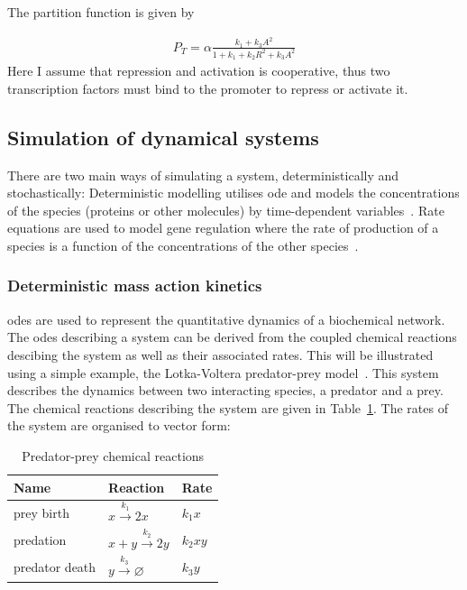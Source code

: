 \noindent The partition function is given by 

\begin{align}
	P_{T} = \alpha \frac{k_1 + k_{3}A^2}{1 + k_1 + k_{2}R^2 + k_{3}A^2}
\end{align}
Here I assume that repression and activation is cooperative, thus two transcription factors must bind to the promoter to repress or activate it. 
\newpage
\subsection{Simulation of dynamical systems}

There are two main ways of simulating a system, deterministically and stochastically: Deterministic modelling utilises \acrshort{ode} and models the concentrations of the species (proteins or other molecules) by time-dependent variables~\autocite{deJong:2002ft}. Rate equations are used to model gene regulation where the rate of production of a species is a function of the concentrations of the other species~\autocite{deJong:2002ft}. 

\subsubsection{Deterministic mass action kinetics}
\label{sec:predator_prey_odes}
\acrshort{ode}s are used to represent the quantitative dynamics of a biochemical network. The \acrshort{ode}s describing a system can be derived from the coupled chemical reactions descibing the system as well as their associated rates. This will be illustrated using a simple example, the Lotka-Voltera predator-prey model~\autocite{lotka:voltera}. This system describes the dynamics between two interacting species, a predator and a prey. The chemical reactions describing the system are given in Table~\ref{tab:pp_reac}. The rates of the system are organised to vector form:


\begin{table}[h]
\centering
\caption{Predator-prey chemical reactions}
\label{tab:pp_reac}
\begin{tabular}{@{}lll@{}}
\toprule
Name & Reaction & Rate \\ \midrule
prey birth & $x \xrightarrow{k_1} 2x$ & $k_{1}x$ \\
predation & $x + y \xrightarrow{k_2} 2y$ & $k_{2}xy$ \\
predator death & $y \xrightarrow{k_3} \varnothing$ & $k_{3}y$ \\ \bottomrule
\end{tabular}
\end{table}

